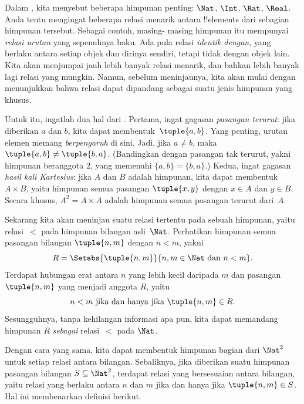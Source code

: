 \documentclass[../../../include/open-logic-section]{subfiles}
\begin{document}

\begin{explain}
Dalam , kita menyebut beberapa himpunan penting:
$\Nat$, $\Int$, $\Rat$, $\Real$. Anda tentu mengingat beberapa relasi menarik
antara !!{element}s dari sebagian himpunan tersebut. Sebagai contoh, masing-
masing himpunan itu mempunyai \emph{relasi urutan} yang sepenuhnya baku. Ada
pula relasi \emph{identik dengan}, yang berlaku antara setiap objek dan
dirinya sendiri, tetapi tidak dengan objek lain. Kita akan menjumpai jauh
lebih banyak relasi menarik, dan bahkan lebih banyak lagi relasi yang mungkin.
Namun, sebelum meninjaunya, kita akan mulai dengan menunjukkan bahwa relasi
dapat dipandang sebagai suatu jenis himpunan yang khusus.

Untuk itu, ingatlah dua hal dari . Pertama, ingat
gagasan \emph{pasangan terurut}: jika diberikan $a$ dan $b$, kita dapat
membentuk~$\tuple{a, b}$. Yang penting, urutan elemen memang \emph{berpengaruh}
di sini. Jadi, jika $a \neq b$, maka $\tuple{a, b} \neq \tuple{b, a}$.
(Bandingkan dengan pasangan tak terurut, yakni himpunan beranggota $2$, yang
memenuhi $\{a, b\}=\{b, a\}$.) Kedua, ingat gagasan \emph{hasil kali
Kartesius}: jika $A$ dan $B$ adalah himpunan, kita dapat membentuk~$A \times
B$, yaitu himpunan semua pasangan $\tuple{x, y}$ dengan $x \in A$ dan $y \in
B$. Secara khusus, $A^{2}= A \times A$ adalah himpunan semua pasangan terurut
dari~$A$.

Sekarang kita akan meninjau suatu relasi tertentu pada sebuah himpunan, yaitu
relasi~$<$ pada himpunan bilangan asli~$\Nat$. Perhatikan himpunan semua
pasangan bilangan $\tuple{n, m}$ dengan $n<m$, yakni
\[
  R=\Setabs{\tuple{n, m}}{n, m \in \Nat \text{ dan } n<m}.
\]
Terdapat hubungan erat antara $n$ yang lebih kecil daripada $m$ dan pasangan
$\tuple{n, m}$ yang menjadi anggota $R$, yaitu
\[
      n<m\text{ jika dan hanya jika }\tuple{n, m} \in R.
\]
Sesungguhnya, tanpa kehilangan informasi apa pun, kita dapat memandang
himpunan $R$ \emph{sebagai} relasi~$<$ pada $\Nat$.

Dengan cara yang sama, kita dapat membentuk himpunan bagian dari $\Nat^{2}$
untuk setiap relasi antara bilangan. Sebaliknya, jika diberikan suatu himpunan
pasangan bilangan $S \subseteq \Nat^{2}$, terdapat relasi yang bersesuaian
antara bilangan, yaitu relasi yang berlaku antara $n$ dan $m$ jika dan hanya jika
$\tuple{n, m} \in S$. Hal ini membenarkan definisi berikut.
\end{explain}
\end{document}
